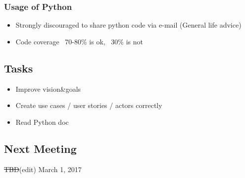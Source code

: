 	\subsubsection{Usage of Python}
	\begin{itemize}
		\item Strongly discouraged to share python code via e-mail (General life advice)
		\item Code coverage ~70-80\% is ok, ~30\% is not
        \end{itemize}
\subsection*{Tasks}
	\begin{itemize}
		\item Improve vision\&goals
		\item Create use cases / user stories / actors correctly
		\item Read Python doc
	\end{itemize}
\subsection*{Next Meeting}
\sout{TBD}(edit)
March 1, 2017
